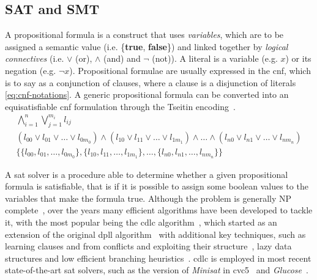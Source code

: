 \documentclass[runningheads]{llncs}
\begin{document}
\subsection{SAT and SMT}

A propositional formula is a construct that uses \textit{variables}, which are to be assigned a semantic value (i.e. \{\textbf{true}, \textbf{false}\}) and linked together by \textit{logical connectives} (i.e. $\lor$ (or), $\land$ (and) and $\neg$ (not)).
A literal is a variable (e.g. $x$) or its negation (e.g. $\neg x$).
Propositional formulae are usually expressed in the \gls{cnf}, which is to say as a conjunction of clauses, where a clause is a disjunction of literals \eqref{eq:cnf-notations}.
A generic propositional formula can be converted into an equisatisfiable \gls{cnf} formulation through the Tseitin encoding~\cite{ref:handbook-sat}.
\begin{equation}
    \label{eq:cnf-notations}
    \begin{gathered}
        \bigwedge_{i=1}^n \bigvee_{j=1}^{m_i} l_{ij} \\
        ( l_{00} \lor l_{01} \lor \dots \lor l_{0m_0}) \land (l_{10} \lor l_{11} \lor \dots \lor l_{1m_1}) \land \dots \land (l_{n0} \lor l_{n1} \lor \dots \lor l_{nm_n}) \\
        \{ \{ l_{00}, l_{01} , \dots , l_{0m_0} \} , \{ l_{10} , l_{11} , \dots , l_{1m_1} \}, \dots , \{ l_{n0} , l_{n1} , \dots , l_{nm_n} \} \}
    \end{gathered}
\end{equation}

A \gls{sat} solver is a procedure able to determine whether a given propositional formula is satisfiable, that is if it is possible to assign some boolean values to the variables that make the formula true.
Although the problem is generally NP complete~\cite{ref:np-sat}, over the years many efficient algorithms have been developed to tackle it, with the most popular being the \gls{cdlc} algorithm~\cite{ref:handbook-sat}, which started as an extension of the original \gls{dpll} algorithm~\cite{ref:dpll} with additional key techniques, such as learning clauses and from conflicts and exploiting their structure~\cite{ref:conflict-driven-clause-learning}, lazy data structures and low efficient branching heuristics~\cite{ref:watched-literals}.
\gls{cdlc} is employed in most recent state-of-the-art \gls{sat} solvers, such as the version of \textit{Minisat} in cvc5~\cite{ref:cvc5-smt-comp-2022} and \textit{Glucose}~\cite{ref:glucose}.
\end{document}
